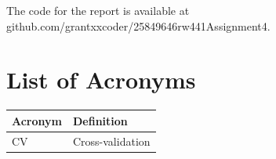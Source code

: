 \documentclass[conference]{IEEEtran}
\begin{document}
The code for the report is available at github.com/grantxxcoder/25849646rw441Assignment4.
\appendix

\section*{List of Acronyms}
\begingroup
\setlength{\tabcolsep}{6pt}
\renewcommand{\arraystretch}{1.05}
\noindent\begin{tabular}{@{}p{}p{}@{}}
\textbf{Acronym} & \textbf{Definition} \\
\midrule
CV & Cross-validation \\
\end{tabular}
\endgroup



\end{document}
